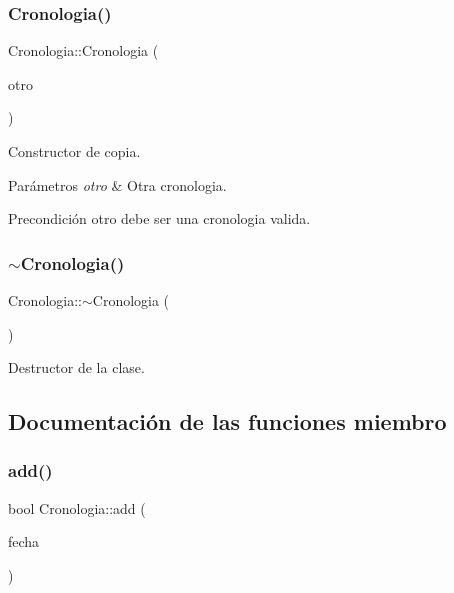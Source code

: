 \subsubsection{\texorpdfstring{Cronologia()}{Cronologia()}\hspace{0.1cm}{\footnotesize\ttfamily [3/3]}}
{\footnotesize\ttfamily Cronologia\+::\+Cronologia (\begin{DoxyParamCaption}\item[{const \hyperlink{classCronologia}{Cronologia} \&}]{otro }\end{DoxyParamCaption})}



Constructor de copia. 


\begin{DoxyParams}{Parámetros}
{\em otro} & Otra cronologia. \\
\hline
\end{DoxyParams}
\begin{DoxyPrecond}{Precondición}
otro debe ser una cronologia valida. 
\end{DoxyPrecond}
\mbox{\label{classCronologia_a7e995892e46a00b54d70a905e2bdbc53}} 
\subsubsection{\texorpdfstring{$\sim$\+Cronologia()}{~Cronologia()}}
{\footnotesize\ttfamily Cronologia\+::$\sim$\+Cronologia (\begin{DoxyParamCaption}{ }\end{DoxyParamCaption})}



Destructor de la clase. 



\subsection{Documentación de las funciones miembro}
\mbox{\label{classCronologia_a4e80e480d5f6c772cca29338468a443c}} 
\subsubsection{\texorpdfstring{add()}{add()}\hspace{0.1cm}{\footnotesize\ttfamily [1/2]}}
{\footnotesize\ttfamily bool Cronologia\+::add (\begin{DoxyParamCaption}\item[{const \hyperlink{classFechaHistorica}{Fecha\+Historica} \&}]{fecha }\end{DoxyParamCaption})}



